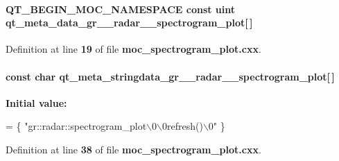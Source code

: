 \paragraph[{qt\+\_\+meta\+\_\+data\+\_\+gr\+\_\+\+\_\+radar\+\_\+\+\_\+spectrogram\+\_\+plot}]{\setlength{\rightskip}{0pt plus 5cm}Q\+T\+\_\+\+B\+E\+G\+I\+N\+\_\+\+M\+O\+C\+\_\+\+N\+A\+M\+E\+S\+P\+A\+CE const uint qt\+\_\+meta\+\_\+data\+\_\+gr\+\_\+\+\_\+radar\+\_\+\+\_\+spectrogram\+\_\+plot[$\,$]\hspace{0.3cm}{\ttfamily [static]}}\label{moc__spectrogram__plot_8cxx_ab17142cd017edf2f1a740838322ca9f3}


Definition at line {\bf 19} of file {\bf moc\+\_\+spectrogram\+\_\+plot.\+cxx}.

\paragraph[{qt\+\_\+meta\+\_\+stringdata\+\_\+gr\+\_\+\+\_\+radar\+\_\+\+\_\+spectrogram\+\_\+plot}]{\setlength{\rightskip}{0pt plus 5cm}const char qt\+\_\+meta\+\_\+stringdata\+\_\+gr\+\_\+\+\_\+radar\+\_\+\+\_\+spectrogram\+\_\+plot[$\,$]\hspace{0.3cm}{\ttfamily [static]}}\label{moc__spectrogram__plot_8cxx_ae1f4518e9d99ac916403658e3ac6adea}
{\bfseries Initial value\+:}
\begin{DoxyCode}
= \{
    \textcolor{stringliteral}{"gr::radar::spectrogram\_plot\(\backslash\)0\(\backslash\)0refresh()\(\backslash\)0"}
\}
\end{DoxyCode}


Definition at line {\bf 38} of file {\bf moc\+\_\+spectrogram\+\_\+plot.\+cxx}.

